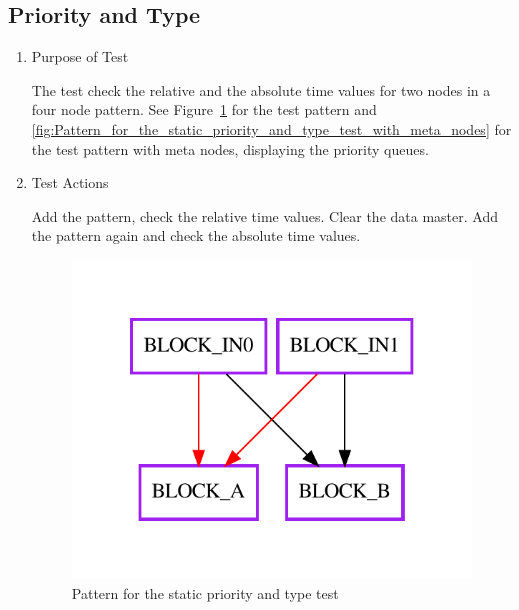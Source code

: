 \documentclass[12pt,a4paper]{report}
\begin{document}
\subsection{Priority and Type}
\begin{enumerate}
	\item Purpose of Test

The test check the relative and the absolute time values for two nodes in a four node pattern. 
See Figure~\ref{fig:Pattern_for_the_static_priority_and_type_test} for the test pattern 
and \ref{fig:Pattern_for_the_static_priority_and_type_test_with_meta_nodes} for the test pattern with meta nodes, 
displaying the priority queues.
	\item Test Actions

	Add the pattern, check the relative time values. Clear the data master. Add the pattern again and check the absolute time values.
    \begin{figure}
        \centering 
        \includegraphics{TestPattern/static_prio_and_type.pdf}
        \caption{Pattern for the static priority and type test}
        \label{fig:Pattern_for_the_static_priority_and_type_test}
    \end{figure}
    \begin{figure}
        \centering 

\end{figure}
\end{enumerate}
\end{document}
